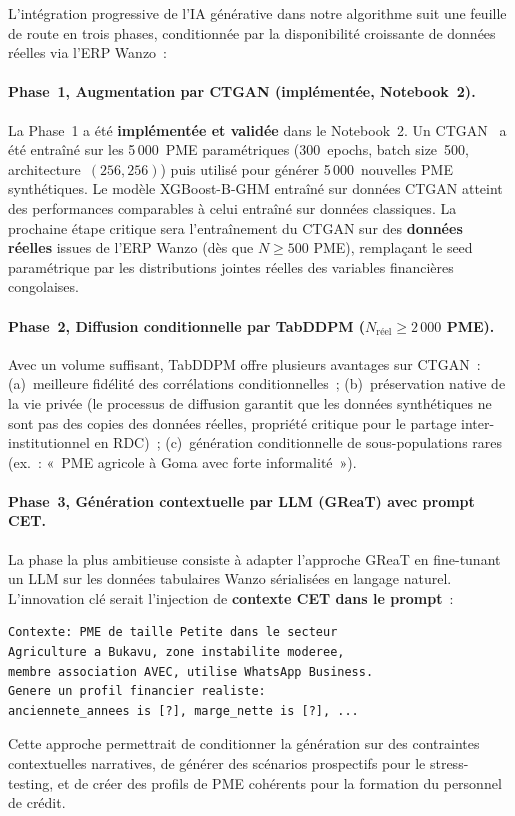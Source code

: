 \documentclass[12pt, a4paper, twocolumn]{article}
\begin{document}
L'intégration progressive de l'IA générative dans notre algorithme suit une feuille de route en trois phases, conditionnée par la disponibilité croissante de données réelles via l'ERP Wanzo~:

\paragraph{Phase~1, Augmentation par CTGAN (implémentée, Notebook~2).}
La Phase~1 a été \textbf{implémentée et validée} dans le Notebook~2. Un CTGAN~\cite{xu2019ctgan} a été entraîné sur les 5\,000~PME paramétriques (300~epochs, batch size~500, architecture~$(256, 256)$) puis utilisé pour générer 5\,000~nouvelles PME synthétiques. Le modèle XGBoost-B-GHM entraîné sur données CTGAN atteint des performances comparables à celui entraîné sur données classiques. La prochaine étape critique sera l'entraînement du CTGAN sur des \textbf{données réelles} issues de l'ERP Wanzo (dès que $N \geq 500$ PME), remplaçant le seed paramétrique par les distributions jointes réelles des variables financières congolaises.

\paragraph{Phase~2, Diffusion conditionnelle par TabDDPM ($N_{\text{réel}} \geq 2\,000$ PME).}
Avec un volume suffisant, TabDDPM \cite{kotelnikov2023} offre plusieurs avantages sur CTGAN~: (a)~meilleure fidélité des corrélations conditionnelles~; (b)~préservation native de la vie privée (le processus de diffusion garantit que les données synthétiques ne sont pas des copies des données réelles, propriété critique pour le partage inter-institutionnel en RDC)~; (c)~génération conditionnelle de sous-populations rares (ex.~: «~PME agricole à Goma avec forte informalité~»).

\paragraph{Phase~3, Génération contextuelle par LLM (GReaT) avec prompt CET.}
La phase la plus ambitieuse consiste à adapter l'approche GReaT \cite{borisov2023} en fine-tunant un LLM sur les données tabulaires Wanzo sérialisées en langage naturel. L'innovation clé serait l'injection de \textbf{contexte CET dans le prompt}~:
\begin{lstlisting}
Contexte: PME de taille Petite dans le secteur
Agriculture a Bukavu, zone instabilite moderee,
membre association AVEC, utilise WhatsApp Business.
Genere un profil financier realiste:
anciennete_annees is [?], marge_nette is [?], ...
\end{lstlisting}
Cette approche permettrait de conditionner la génération sur des contraintes contextuelles narratives, de générer des scénarios prospectifs pour le stress-testing, et de créer des profils de PME cohérents pour la formation du personnel de crédit.
\end{document}
